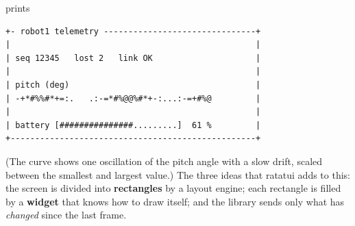 prints
\begin{verbatim}
+- robot1 telemetry -------------------------------+
|                                                  |
| seq 12345   lost 2   link OK                     |
|                                                  |
| pitch (deg)                                      |
| -+*#%%#*+=:.   .:-=*#%@@%#*+-:...:-=+#%@         |
|                                                  |
| battery [###############.........]  61 %         |
+--------------------------------------------------+
\end{verbatim}
(The curve shows one oscillation of the pitch angle with a slow drift, scaled between the smallest and largest value.) The three ideas that ratatui adds to this: the screen is divided into \textbf{rectangles} by a layout engine; each rectangle is filled by a \textbf{widget} that knows how to draw itself; and the library sends only what has \emph{changed} since the last frame.

